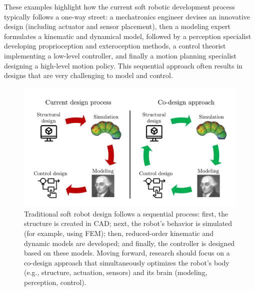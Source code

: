 These examples highlight how the current soft robotic development process typically follows a one-way street: a mechatronics engineer devises an innovative design (including actuator and sensor placement), then a modeling expert formulates a kinematic and dynamical model, followed by a perception specialist developing proprioception and exteroception methods, a control theorist implementing a low-level controller, and finally a motion planning specialist designing a high-level motion policy. This sequential approach often results in designs that are very challenging to model and control.

\begin{figure}[ht]
    \centering
    \includegraphics[width=0.6\linewidth]{conclusion/figures/future_work/co_design/motivation_co_design_v1_cropped.pdf}
    \caption{Traditional soft robot design follows a sequential process: first, the structure is created in \gls{CAD}; next, the robot’s behavior is simulated (for example, using \gls{FEM}); then, reduced-order kinematic and dynamic models are developed; and finally, the controller is designed based on these models. Moving forward, research should focus on a co-design approach that simultaneously optimizes the robot’s body (e.g., structure, actuation, sensors) and its brain (modeling, perception, control).}
    \label{fig:conclusion:future_work:co_design:motivation}
\end{figure}

